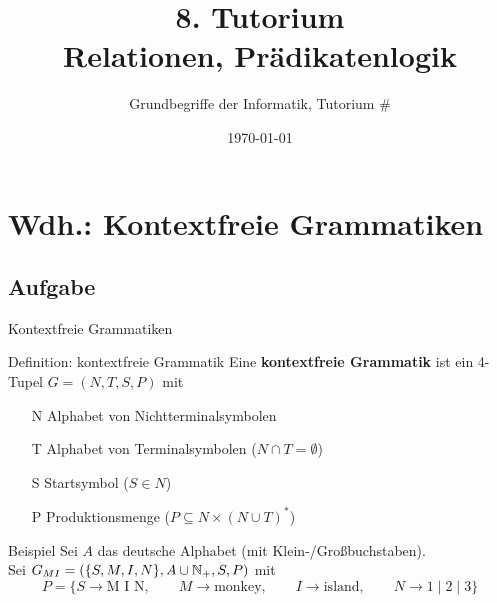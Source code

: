 




\title[Relationen, Prädikatenlogik]{8. Tutorium\\ Relationen, Prädikatenlogik}
\subtitle{Grundbegriffe der Informatik, Tutorium \#\mytutnumber}
\date{\today}


\titleframe
\roadmap

\section[Kontextfreie Grammatiken]{Wdh.: Kontextfreie Grammatiken}
\subsection{Aufgabe}

\begin{frame}{Kontextfreie Grammatiken}
	\begin{block}{Definition: kontextfreie Grammatik}
		Eine \textbf{kontextfreie Grammatik} ist ein 4-Tupel $G = (N, T, S ,P)$ mit
		\begin{itemize}
			\item[N] Alphabet von Nichtterminalsymbolen
			\item[T] Alphabet von Terminalsymbolen ($N \cap T = \emptyset$)
			\item[S] Startsymbol ($S \in N$)
			\item[P] Produktionsmenge ($P \subseteq N \times (N \cup T)^\ast$)
		\end{itemize}
	\end{block}

	\begin{exampleblock}{Beispiel}
		Sei $A$ das deutsche Alphabet (mit Klein-/Großbuchstaben).\\
		Sei $G_{MI} = (\{S, M, I, N\}, A \cup \mathbb{N}_+, S, P)$ mit
		\[
			P = \{S \to \text{M I N}, \qquad M \to \text{monkey}, \qquad I \to \text{island}, \qquad N \to 1 \mid 2 \mid 3 \}
		\]
	\end{exampleblock}
\end{frame}

